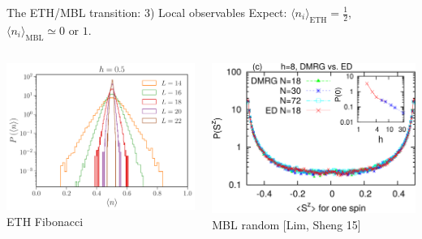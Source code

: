 \begin{frame}{The ETH/MBL transition: 3) Local observables}
Expect: $\langle n_i \rangle_\text{ETH} = \frac{1}{2}$, $\langle n_i \rangle_\text{MBL} \simeq 0 \text{ or } 1$.
\begin{columns}
\begin{column}{0.33\textwidth}
\centering
\includegraphics[width=\textwidth]{img/3_Fibonacci/sz_ETH}
{\footnotesize ETH Fibonacci}
\end{column}
\begin{column}{0.33\textwidth}
\centering
\includegraphics[width=\textwidth]{img/3_Fibonacci/surface768}
{\footnotesize MBL random [Lim, Sheng 15]}
\end{column}

\end{columns}
\end{frame}

